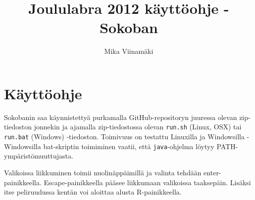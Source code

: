 \documentclass{article}
\begin{document}
\title{Joululabra 2012 käyttöohje - Sokoban}
\author{Mika Viinamäki}
\maketitle

\section*{Käyttöohje}
Sokobanin saa käynnistettyä purkamalla GitHub-repositoryn juuressa olevan zip-tiedoston jonnekin ja ajamalla zip-tiedostossa olevan \verb=run.sh= (Linux, OSX) tai \verb=run.bat= (Windows) -tiedoston. Toimivuus on testattu Linuxilla ja Windowsilla - Windowsilla bat-skriptin toimiminen vaatii, että \verb=java=-ohjelma löytyy PATH-ympäristömuuttujasta.

Valikoissa liikkuminen toimii nuolinäppäimillä ja valinta tehdään enter-painikkeella. Escape-painikkeella pääsee liikkumaan valikoissa taaksepäin. Lisäksi itse peliruudussa kentän voi aloittaa alusta R-painikkeella.
\end{document}

